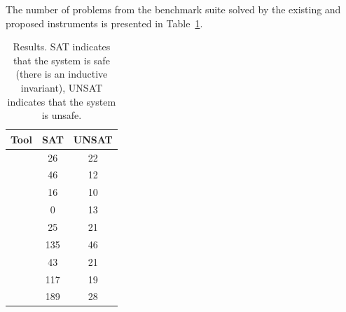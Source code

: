 The number of problems from the benchmark suite solved by the existing and proposed instruments is presented in Table~\ref{table:eval-all}.
\begin{table}[t]
    \caption{Results. SAT indicates that the system is safe (there is an inductive invariant), UNSAT indicates that the system is unsafe.}
    \label{table:eval-all}
    \small
    \centering
    \begin{tabular}{ |l||c|c| }
    \hline\hline
    Tool & SAT & UNSAT\\\hline\hline
    \racer{} & 26 & 22\\
    \eldarica{} & 46 & 12\\
    \vericat{} & 16 & 10\\
    \cvcind{} & 0 & 13\\
    \hline
    \ringen{\cvc{}} & 25 & 21\\
    \ringen{\vampire{}} & 135 & 46\\
    \ringenSync{} & 43 & 21\\
    \ringenCICI{\cvc{}} & 117 & 19\\
    \ringenCICI{\vampire{}} & 189 & 28\\
    \hline\hline
    \end{tabular}
\end{table}


